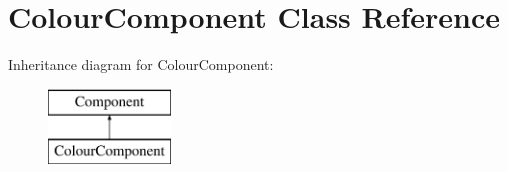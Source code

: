 \hypertarget{class_colour_component}{\section{Colour\+Component Class Reference}
\label{class_colour_component}
}
Inheritance diagram for Colour\+Component\+:\begin{figure}[H]
\begin{center}
\leavevmode
\includegraphics[height=2.000000cm]{class_colour_component}
\end{center}
\end{figure}
